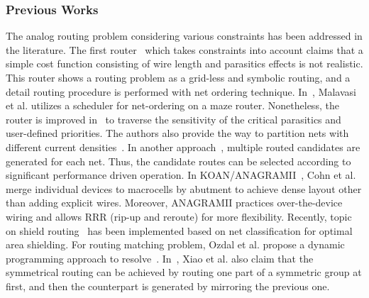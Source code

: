       \subsubsection{Previous Works}
        The analog routing problem considering various constraints has been addressed in the literature. The first router~\cite{anrmfca-CICC1990} which takes constraints into account claims that a simple cost function consisting of wire length and parasitics effects is not realistic. This router shows a routing problem as a grid-less and symbolic routing, and a detail routing procedure is performed with net ordering technique. In~\cite{GeneralRouter-CompEuro89}, Malavasi et al. utilizes a scheduler for net-ordering on a maze router. Nonetheless, the router is improved in~\cite{sensitAR-iccad90} to traverse the sensitivity of the critical parasitics and user-defined priorities. The authors also provide the way to partition nets with different current densities~\cite{arearouting-tcad1993}. In another approach~\cite{GRforAMS-SOCC2001}, multiple routed candidates are generated for each net. Thus, the candidate routes can be selected according to significant performance driven operation. In KOAN/ANAGRAMII~\cite{KOAN_ANAGRAMII-JSSC1991}, Cohn et al. merge individual devices to macrocells by abutment to achieve dense layout other than adding explicit wires. Moreover, ANAGRAMII practices over-the-device wiring and allows RRR (rip-up and reroute) for more flexibility. Recently, topic on shield routing~\cite{shieldRouting-islped2010} has been implemented based on net classification for optimal area shielding. For routing matching problem, Ozdal et al. propose a dynamic programming approach to resolve~\cite{AnalogRouteMatching-iccad2009}. In~\cite{LinfuXiao-iccad2010}, Xiao et al. also claim that the symmetrical routing can be achieved by routing one part of a symmetric group at first, and then the counterpart is generated by mirroring the previous one.
        
